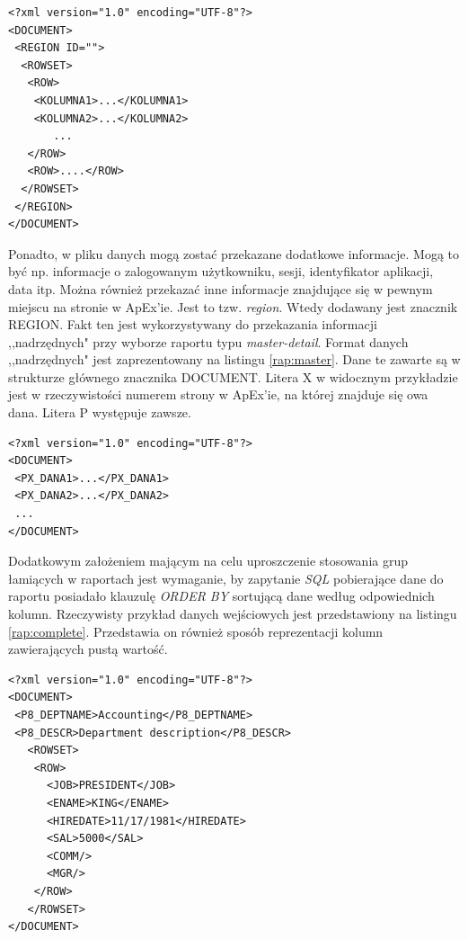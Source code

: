 \documentclass[11pt,a4paper]{article}
\begin{document}
\lstset{language=XML}
\begin{lstlisting}[frame=single,caption=Ogólna postać dokumentu XML z danymi pochodzącymi z ApExa,label=rap:apex]
<?xml version="1.0" encoding="UTF-8"?>
<DOCUMENT>
 <REGION ID="">
  <ROWSET>
   <ROW>
    <KOLUMNA1>...</KOLUMNA1>
    <KOLUMNA2>...</KOLUMNA2>
       ...	
   </ROW>
   <ROW>....</ROW>
  </ROWSET>
 </REGION>
</DOCUMENT>
\end{lstlisting}

Ponadto, w pliku danych mogą zostać przekazane dodatkowe informacje. Mogą to być np. informacje o zalogowanym użytkowniku, sesji, identyfikator aplikacji, data itp. Można również przekazać inne informacje znajdujące się w pewnym miejscu na stronie w ApEx'ie. Jest to tzw. \emph{region}. Wtedy dodawany jest znacznik REGION. Fakt ten jest wykorzystywany do przekazania informacji ,,nadrzędnych" przy wyborze raportu typu \emph{master-detail}. Format danych ,,nadrzędnych" jest zaprezentowany na listingu \ref{rap:master}. Dane te zawarte są w strukturze głównego znacznika DOCUMENT. Litera X w widocznym przykładzie jest w rzeczywistości numerem strony w ApEx'ie, na której znajduje się owa dana. Litera P występuje zawsze. 

\lstset{language=XML}
\begin{lstlisting}[frame=single,caption=Format danych typu \emph{master},label=rap:master]
<?xml version="1.0" encoding="UTF-8"?>
<DOCUMENT>
 <PX_DANA1>...</PX_DANA1>
 <PX_DANA2>...</PX_DANA2>
 ...
</DOCUMENT>
\end{lstlisting}

Dodatkowym założeniem mającym na celu uproszczenie stosowania grup łamiących w raportach jest wymaganie, by zapytanie \emph{SQL} pobierające dane do raportu posiadało klauzulę \emph{ORDER BY} sortującą dane według odpowiednich kolumn. Rzeczywisty przykład danych wejściowych jest przedstawiony na listingu \ref{rap:complete}. Przedstawia on również sposób reprezentacji kolumn zawierających pustą wartość. 

\lstset{language=XML}
\begin{lstlisting}[frame=single,caption=Przykładowe dane,label=rap:complete]
<?xml version="1.0" encoding="UTF-8"?>
<DOCUMENT>
 <P8_DEPTNAME>Accounting</P8_DEPTNAME>
 <P8_DESCR>Department description</P8_DESCR>
   <ROWSET>
    <ROW>
      <JOB>PRESIDENT</JOB>
      <ENAME>KING</ENAME>
      <HIREDATE>11/17/1981</HIREDATE>
      <SAL>5000</SAL>
      <COMM/>
      <MGR/>
    </ROW>
   </ROWSET>
</DOCUMENT>
\end{lstlisting}
\end{document}
